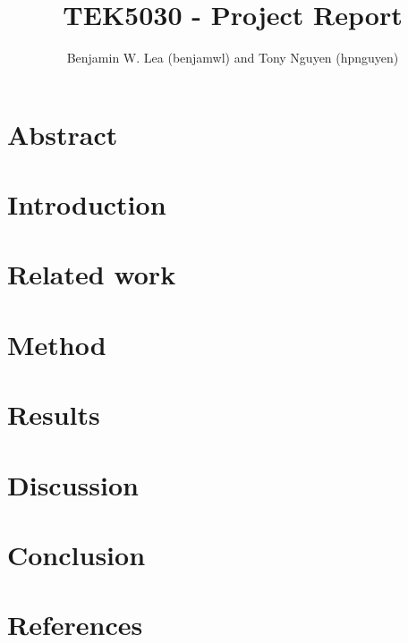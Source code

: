 \documentclass[10pt,a4paper]{article}
\author{Benjamin W. Lea (benjamwl) and Tony Nguyen (hpnguyen)}
\title{TEK5030 - Project Report}
\date{}
\begin{document}
\maketitle

\section{Abstract}
\section{Introduction}
\section{Related work}
\section{Method}
\section{Results}
\section{Discussion}
\section{Conclusion}
\section{References}
\end{document}

